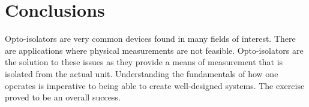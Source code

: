 \documentclass[CMPE]{KGCOEReport}
\begin{document}
\section{Conclusions}
Opto-isolators are very common devices found in many fields of interest. There are applications 
where physical measurements are not feasible. Opto-isolators are the solution to these issues as 
they provide a means of measurement that is isolated from the actual unit. Understanding the fundamentals 
of how one operates is imperative to being able to create well-designed systems. The exercise proved to be an overall success.


\end{document}
